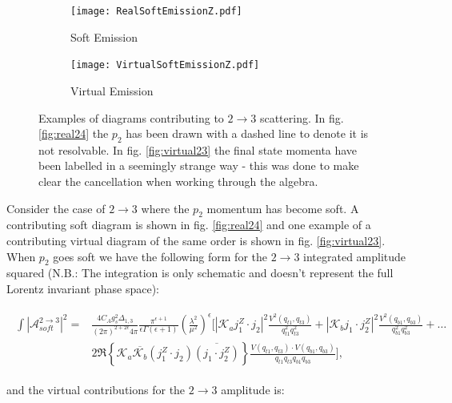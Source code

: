 		\begin{figure}[bthp]
			\centering
			\begin{subfigure}[b]{0.5\textwidth}
				\texttt{[image: RealSoftEmissionZ.pdf]}
				\caption{Soft Emission}
				\label{fig:real24}
			\end{subfigure}

			\begin{subfigure}[b]{0.5\textwidth}
				\centering
				\texttt{[image: VirtualSoftEmissionZ.pdf]}
				\caption{Virtual Emission}
				\label{fig:virtual23}
			\end{subfigure}

			\caption{Examples of diagrams contributing to $2\rightarrow3$ scattering.
			In fig. \eqref{fig:real24} the $p_2$ has been drawn with a dashed line to denote
			it is not resolvable.  In fig. \eqref{fig:virtual23} the final state momenta have
			been labelled in a seemingly strange way - this was done to make clear the
			cancellation when working through the algebra.}

			\label{fig:2to}
		\end{figure}

		Consider the case of $2\rightarrow3$ where the
		$p_2$ momentum has become soft.  A contributing soft diagram is shown in fig. \eqref{fig:real24} and
		one example of a contributing virtual diagram of the same order is shown in fig. \eqref{fig:virtual23}.
		When $p_2$ goes soft we have the following form for the $2\rightarrow3$ integrated amplitude squared
		({N.B.}: The integration is only schematic and doesn't represent the full Lorentz invariant phase space):

		\begin{align}
		\begin{split}
			\int|\mathcal{A}^{2\rightarrow3}_{soft}|^2 = &\frac{4C_Ag_s^2\Delta_{1,3}}{(2\pi)^{2+2\epsilon}4\pi}
			\frac{\pi^{\epsilon+1}}{\epsilon\Gamma(\epsilon+1)}
			\left(\frac{\lambda^2}{\mu^2}\right)^\epsilon\Bigg[|\mathcal{K}_aj_1^Z\cdot j_2|^2
			\frac{V^2(q_{t1}, q_{t3})}{q^2_{t1}q^2_{t3}} + |\mathcal{K}_bj_1\cdot j_2^Z|^2
			\frac{V^2(q_{b1}, q_{b3})}{q^2_{b1}q^2_{b3}} + \ldots \\
			& 2\Re\left\{\mathcal{K}_a\overline{\mathcal{K}_b}
			(j_1^Z\cdot j_2)\overline{(j_1\cdot j_2^Z)}\right\} \frac{V(q_{t1}, q_{t3})
			\cdot V(q_{b1}, q_{b3})}{q_{t1}q_{t3}q_{b1}q_{b3}}\Bigg],
		\end{split}
		\end{align}

		and the virtual contributions for the $2\rightarrow3$ amplitude is:

